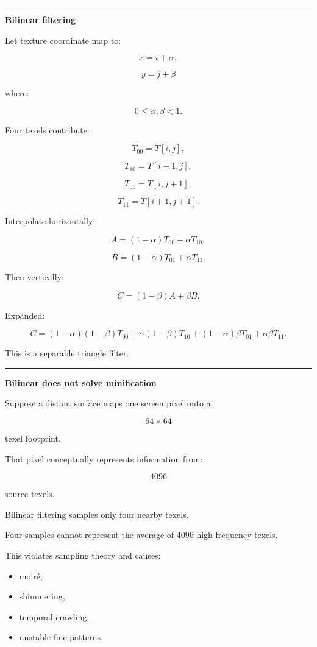\begin{center}\rule{0.5\linewidth}{0.5pt}\end{center}

\textbf{Bilinear filtering}

Let texture coordinate map to:

\[
x=i+\alpha,
\]

\[
y=j+\beta
\]

where:

\[
0\le\alpha,\beta<1.
\]

Four texels contribute:

\[
T_{00}=T[i,j],
\]

\[
T_{10}=T[i+1,j],
\]

\[
T_{01}=T[i,j+1],
\]

\[
T_{11}=T[i+1,j+1].
\]

Interpolate horizontally:

\[
A=(1-\alpha)T_{00}+\alpha T_{10},
\]

\[
B=(1-\alpha)T_{01}+\alpha T_{11}.
\]

Then vertically:

\[
\boxed{
C=(1-\beta)A+\beta B.
}
\]

Expanded:

\[
C=
(1-\alpha)(1-\beta)T_{00}
+
\alpha(1-\beta)T_{10}
+
(1-\alpha)\beta T_{01}
+
\alpha\beta T_{11}.
\]

This is a separable triangle filter.

\begin{center}\rule{0.5\linewidth}{0.5pt}\end{center}

\textbf{Bilinear does not solve minification}

Suppose a distant surface maps one screen pixel onto a:

\[
64\times64
\]

texel footprint.

That pixel conceptually represents information from:

\[
4096
\]

source texels.

Bilinear filtering samples only four nearby texels.

Four samples cannot represent the average of 4096 high-frequency texels.

This violates sampling theory and causes:

\begin{itemize}
\tightlist
\item
  moiré,
\item
  shimmering,
\item
  temporal crawling,
\item
  unstable fine patterns.
\end{itemize}

